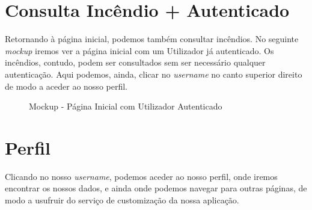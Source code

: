 \documentclass[a4paper,12pt]{scrreprt}
\newcommand{\tab}{
    \hspace{1cm}}
\begin{document}
\section{Consulta Incêndio + Autenticado}

\tab Retornando à página inicial, podemos também consultar incêndios. No seguinte \textit{mockup} iremos ver a página inicial com um Utilizador já autenticado. Os incêndios, contudo, podem ser consultados sem ser necessário qualquer autenticação. Aqui podemos, ainda, clicar no \textit{username} no canto superior direito de modo a aceder ao nosso perfil.

\vspace{1cm}

\begin{figure}[hbt!]
    \centering
    \caption{Mockup - Página Inicial com Utilizador Autenticado}
\end{figure}
\clearpage

\section{Perfil}

\tab Clicando no nosso \textit{username}, podemos aceder ao nosso perfil, onde iremos encontrar os nossos dados, e ainda onde podemos navegar para outras páginas, de modo a usufruir do serviço de customização da nossa aplicação.

\vspace{1cm}
\end{document}
